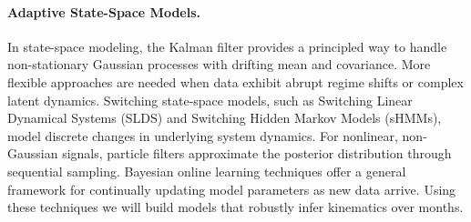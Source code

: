 \paragraph{Adaptive State-Space Models.}

In state-space modeling, the Kalman filter provides a principled way to handle
non-stationary Gaussian processes with drifting mean and covariance. More
flexible approaches are needed when data exhibit abrupt regime shifts or
complex latent dynamics. Switching state-space models, such as Switching Linear
Dynamical Systems (SLDS) and Switching Hidden Markov Models (sHMMs), model
discrete changes in underlying system dynamics. For nonlinear, non-Gaussian
signals, particle filters approximate the posterior distribution through
sequential sampling. Bayesian online learning techniques offer a general
framework for continually updating model parameters as new data arrive.
%
Using these techniques we will build models that robustly infer kinematics
over months.

\begin{comment}

\paragraph{Concept Drift in Machine Learning.}

In the machine learning literature, non-stationarity is often studied under the
framework of \emph{concept drift}~\citep{conceptdriftReview}, which refers to
shifts in the joint distribution of inputs and outputs over time.
%
Drift may be sudden, gradual, or cyclical (e.g., re-emergence of behavioral
patterns linked to circadian modulation).
%
Techniques for handling concept drift fall into several broad categories: (1)
detection methods, which monitor for significant distributional changes; (2)
adaptation methods, which adjust models incrementally using sliding windows,
online learning, or ensemble updates; and (3) forgetting mechanisms, which
allow models to "forget" outdated information while retaining relevant past
knowledge.
%
We will use techniques from concept drift for models that do not fall in the
previous categories (i.e.; they are not linear models, artificial neural
network models or state-space models).
%
For instance, we will use these techniques to build \href{RPM}s to estimate
joint behavioral and neural latents across months.

In summary, robust modeling of NaLoDuCo datasets demands tools that adapt
continuously to changing data distributions. Our offline analysis framework
will incorporate both well-established adaptive algorithms and cutting-edge
methods from continual learning and concept drift research to address this
fundamental challenge.

\end{comment}

